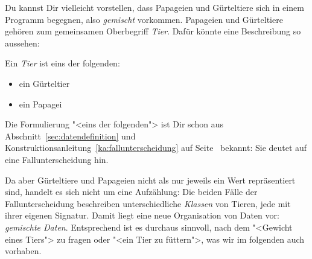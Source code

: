 Du kannst Dir vielleicht vorstellen, dass Papageien und
Gürteltiere sich in einem Programm begegnen, also \emph{gemischt}
vorkommen.  Papageien und Gürteltiere gehören zum gemeinsamen
Oberbegriff \textit{Tier}.  Dafür könnte eine
Beschreibung so aussehen:

\medskip

\noindent Ein \textit{Tier} ist eins der folgenden:
% 
\begin{itemize}
\item ein Gürteltier
\item ein Papagei
\end{itemize}
%
Die Formulierung "<eins der folgenden"> ist Dir schon aus
Abschnitt~\ref{sec:datendefinition} und
Konstruktionsanleitung~\ref{ka:fallunterscheidung} auf
Seite~\pageref{ka:fallunterscheidung} bekannt: Sie deutet auf eine
Fallunterscheidung hin.

Da aber Gürteltiere und Papageien nicht als nur jeweils ein Wert
repräsentiert sind, handelt es sich nicht um eine Aufzählung: Die
beiden Fälle der Fallunterscheidung beschreiben unterschiedliche
\textit{Klassen} von Tieren, jede mit ihrer eigenen
Signatur.  Damit liegt eine neue Organisation von Daten vor:
\textit{gemischte Daten}. Entsprechend ist es
durchaus sinnvoll, nach dem "<Gewicht eines Tiers"> zu fragen oder
"<ein Tier zu füttern">, was wir im folgenden auch vorhaben.

